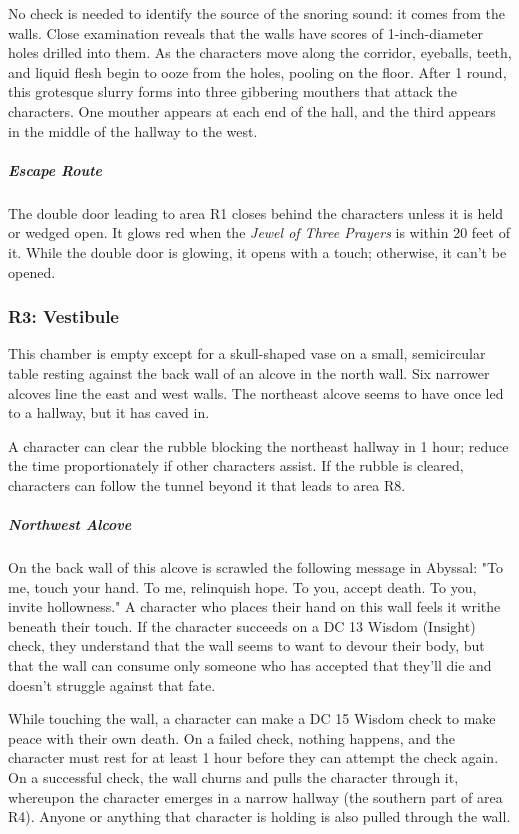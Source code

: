 \documentclass[10pt,a4paper,twoside,fancy,bg=print,twocolumn,openany,nodeprecatedcode]{dndbook}
\begin{document}
No check is needed to identify the source of the snoring sound: it comes from the walls. Close examination reveals that the walls have scores of 1-inch-diameter holes drilled into them. As the characters move along the corridor, eyeballs, teeth, and liquid flesh begin to ooze from the holes, pooling on the floor. After 1 round, this grotesque slurry forms into three gibbering mouthers that attack the characters. One mouther appears at each end of the hall, and the third appears in the middle of the hallway to the west.

\subparagraph{Escape Route}
The double door leading to area R1 closes behind the characters unless it is held or wedged open. It glows red when the \textit{Jewel of Three Prayers} is within 20 feet of it. While the double door is glowing, it opens with a touch; otherwise, it can't be opened.

\subsubsection{R3: Vestibule}
\begin{DndReadAloud}{}
This chamber is empty except for a skull-shaped vase on a small, semicircular table resting against the back wall of an alcove in the north wall. Six narrower alcoves line the east and west walls. The northeast alcove seems to have once led to a hallway, but it has caved in.

\end{DndReadAloud}

A character can clear the rubble blocking the northeast hallway in 1 hour; reduce the time proportionately if other characters assist. If the rubble is cleared, characters can follow the tunnel beyond it that leads to area R8.

\subparagraph{Northwest Alcove}
On the back wall of this alcove is scrawled the following message in Abyssal: "To me, touch your hand. To me, relinquish hope. To you, accept death. To you, invite hollowness." A character who places their hand on this wall feels it writhe beneath their touch. If the character succeeds on a DC 13 Wisdom (Insight) check, they understand that the wall seems to want to devour their body, but that the wall can consume only someone who has accepted that they'll die and doesn't struggle against that fate.

While touching the wall, a character can make a DC 15 Wisdom check to make peace with their own death. On a failed check, nothing happens, and the character must rest for at least 1 hour before they can attempt the check again. On a successful check, the wall churns and pulls the character through it, whereupon the character emerges in a narrow hallway (the southern part of area R4). Anyone or anything that character is holding is also pulled through the wall.
\end{document}
